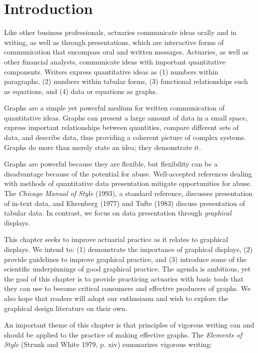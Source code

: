 \section{Introduction}\label{S21:Intro}

Like other business professionals, actuaries communicate ideas
orally and in writing, as well as through presentations, which are
interactive forms of communication that encompass oral and written
messages. Actuaries, as well as other financial analysts,
communicate ideas with important quantitative components. Writers
express quantitative ideas as (1) numbers within paragraphs, (2)
numbers within tabular forms, (3) functional relationships such as
equations, and (4) data or equations as graphs.

Graphs are a simple yet powerful medium for written communication of
quantitative ideas. Graphs can present a large amount of data in a
small space, express important relationships between quantities,
compare different sets of data, and describe data, thus providing a
coherent picture of complex systems. Graphs do more than merely
state an idea; they demonstrate it.

Graphs are powerful because they are flexible, but flexibility can
be a disadvantage because of the potential for abuse. Well-accepted
references dealing with methods of quantitative data presentation
mitigate opportunities for abuse. The \emph{Chicago Manual of Style}
(1993), a standard reference, discusses presentation of in-text
data, and Ehrenberg (1977) and Tufte (1983) discuss presentation of
tabular data. In contrast, we focus on data presentation through
\emph{graphical} displays.

This chapter seeks to improve actuarial practice as it relates to
graphical displays. We intend to: (1) demonstrate the importance of
graphical displays, (2) provide guidelines to improve graphical
practice, and (3) introduce some of the scientific underpinnings of
good graphical practice. The agenda is ambitious, yet the goal of
this chapter is to provide practicing actuaries with basic tools
that they can use to become critical consumers and effective
producers of graphs. We also hope that readers will adopt our
enthusiasm and wish to explore the graphical design literature on
their own.

An important theme of this chapter is that principles of vigorous
writing can and should be applied to the practice of making
effective graphs. The \emph{Elements of Style} (Strunk and White
1979, p. xiv) summarizes vigorous writing:

